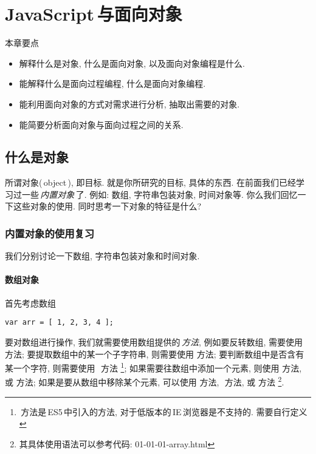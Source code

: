 \chapter{JavaScript\,与面向对象}

本章要点

\begin{itemize}
\item 解释什么是对象, 什么是面向对象, 以及面向对象编程是什么.
\item 能解释什么是面向过程编程, 什么是面向对象编程.
\item 能利用面向对象的方式对需求进行分析, 抽取出需要的对象.
\item 能简要分析面向对象与面向过程之间的关系.
\end{itemize}



\section{什么是对象}

所谓对象(\,object\,), 即目标. 就是你所研究的目标, 具体的东西. 在前面我们已经学习过一些\,\emph{内置对象}\,了. 
例如: 数组, 字符串包装对象, 时间对象等. 你么我们回忆一下这些对象的使用. 同时思考一下对象的特征是什么?


\subsection{内置对象的使用复习}

我们分别讨论一下数组, 字符串包装对象和时间对象.



\subsubsection{数组对象}

首先考虑数组%
%
\begin{lstlisting}
var arr = [ 1, 2, 3, 4 ];
\end{lstlisting}%
%
要对数组进行操作, 我们就需要使用数组提供的\,\emph{方法}, 例如要反转数组, 需要使用\,\,方法;
要提取数组中的某一个子字符串, 则需要使用\,\,方法; 要判断数组中是否含有某一个字符, 则需要使用%
\,\,方法%
%
\footnote{\,方法是\,ES5\,中引入的方法, 对于低版本的\,IE\,浏览器是不支持的. 需要自行定义};%
%
如果需要往数组中添加一个元素, 则使用\,\,方法, 或\,\,方法; 如果是要从数组中移除某个元素,
可以使用\,\,方法, \,\,方法, 或\,\,方法%
%
\footnote{其具体使用语法可以参考代码: \textsf{01-01-01-array.html}}.



